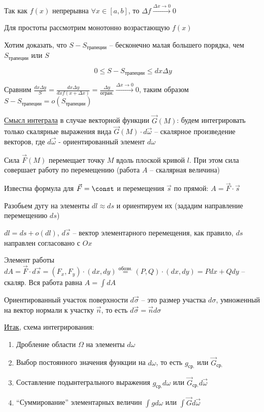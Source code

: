 \documentclass[12pt]{article}
\begin{document}
    Так как $f(x)$ непрерывна $\forall x \in [a, b]$, то $\Delta f \stackrel{\Delta x \to 0}{\rightarrow} 0$

    Для простоты рассмотрим монотонно возрастающую $f(x)$

    Хотим доказать, что $S - S_{\text{трапеции}}$ -- бесконечно малая большего порядка, чем $S_{\text{трапеции}}$ или $S$

    \[0 \leq S - S_{\text{трапеции}} \leq dx \Delta y\]

    Сравним $\frac{dx \Delta y}{S} = \frac{dx \Delta y}{dx f(x + \Delta x)} = \frac{\Delta y}{\text{огран.}} \stackrel{\Delta x \to 0}{\rightarrow} 0$, 
    таким образом $S - S_{\text{трапеции}} = o(S_{\text{трапеции}})$

    \underline{Смысл интеграла} в случае векторной функции $\overrightarrow{G}(M)$: будем интегрировать только скалярные выражения вида $\vec{G}(M) \cdot d\vec{\omega}$ -- скалярное произведение векторов,
    где $d\vec{\omega}$ - ориентированный элемент $d\omega$

    \Ex Сила $\vec{F}(M)$ перемещает точку $M$ вдоль плоской кривой $l$. При этом сила совершает работу по перемещению
    (работа $A$ -- скалярная величина)

    Известна формула для $\vec{F} = \const$ и перемещения $\vec{s}$ по прямой: $A = \vec{F} \cdot \vec{s}$

    Разобьем дугу на элементы $dl \approx ds$ и ориентируем их (зададим направление перемещению $ds$)

    $dl = ds + o(dl)$, $d\vec{s}$ -- вектор элементарного перемещения, как правило, $ds$ направлен согласовано с $Ox$

    Элемент работы $dA = \vec{F} \cdot d\vec{s} = (F_x, F_y) \cdot (dx, dy) \stackrel{\text{обозн.}}{=}
    (P, Q) \cdot (dx, dy) = Pdx + Qdy$ -- скаляр. Вся работа равна $A = \int dA$

    \Nota Ориентированный участок поверхности $d\vec{\sigma}$ -- это размер участка $d\sigma$, умноженный на вектор нормали к участку $\vec{n}$,
    то есть $d\vec{\sigma} = \vec{n}d\sigma$

    \underline{Итак}, схема интегрирования:

    \begin{enumerate}[label*=\textbf{\arabic**} ]
        \item Дробление области $\Omega$ на элементы $d\omega$

        \item Выбор постоянного значения функции на $d\omega$, то есть $g_{\text{ср.}}$ или $\vec{G}_\text{ср.}$

        \item Составление подынтегрального выражения $g_{\text{ср.}}d\omega$ или $\vec{G}_\text{ср.}d\vec{\omega}$

        \item \enquote{Суммирование} элементарных величин $\int gd\omega$ или $\int \vec{G}d\vec{\omega}$
    \end{enumerate}
\end{document}
